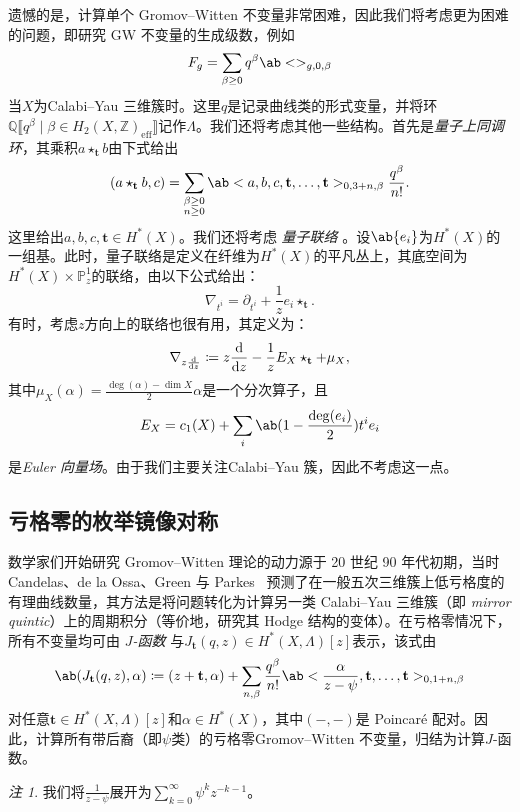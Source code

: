 \documentclass{amsart}
\theoremstyle{definition}
\theoremstyle{remark}
\newtheorem{rmk}[thm]{注}
\theoremstyle{plain}
\theoremstyle{definition}
\theoremstyle{remark}
\newcommand{\Z}{\mathbb{Z}}
\newcommand{\Q}{\mathbb{Q}}
\renewcommand{\P}{\mathbb{P}}
\newcommand{\mbf}[1]{\mathbf{#1}}
\newcommand{\mr}[1]{\mathrm{#1}}
\newcommand{\1}{\mathbf{1}}
\newcommand{\2}{\mathbf{2}}
\newcommand{\3}{\mathbf{3}}
\newcommand{\ps}[1]{\llbracket #1 \rrbracket}
\begin{document}
遗憾的是，计算单个 Gromov--Witten 不变量非常困难，因此我们将考虑更为困难的问题，即研究 GW 不变量的生成级数，例如
\[ F_g = \sum_{\beta \geq 0} q^{\beta} \ab<>_{g,0,\beta} \]
当\(X\)为Calabi--Yau 三维簇时。这里\(q\)是记录曲线类的形式变量，并将环\(\Q\ps{q^{\beta} \mid \beta \in H_2(X, \Z)_{\mr{eff}}}\)记作\(\Lambda\)。我们还将考虑其他一些结构。首先是\textit{量子上同调环}，其乘积\(a \star_{\mbf{t}} b\)由下式给出
\[
    (a \star_{\mbf{t}} b, c) = \sum_{\substack{\beta \geq 0 \\ n \geq 0}} \ab<a,b,c, \mbf{t}, \ldots, \mbf{t}>_{0,3+n,\beta} \frac{q^{\beta}}{n!}.
\]
这里给出\(a,b,c, \mbf{t} \in H^*(X)\)。我们还将考虑 \textit{ 量子联络 }。设\(\ab\{ e_i \}\)为\(H^*(X)\)的一组基。此时，量子联络是定义在纤维为\(H^*(X)\)的平凡丛上，其底空间为\(H^*(X) \times \P^1_z\)的联络，由以下公式给出：
\[ \nabla_{t^i} = \partial_{t^i} + \frac{1}{z} e_i \star_{\mbf{t}}. \]
有时，考虑\(z\)方向上的联络也很有用，其定义为：
\[ \nabla_{z \odv{}{z}} \coloneqq z \odv{}{z} - \frac{1}{z} E_X \star_{\mbf{t}} + \mu_X, \]
其中\(\mu_X(\alpha) = \frac{\deg(\alpha) - \dim X}{2} \alpha\)是一个分次算子，且
\[ E_X = c_1(X) + \sum_i \ab(1 - \frac{\deg(e_i)}{2})t^i e_i \]
是\textit{Euler 向量场}。由于我们主要关注Calabi--Yau 簇，因此不考虑这一点。

\subsection{亏格零的枚举镜像对称}%
\label{sub:Enumerative mirror symmetry in genus zero}

数学家们开始研究 Gromov--Witten 理论的动力源于 20 世纪 90 年代初期，当时 Candelas、de la Ossa、Green 与 Parkes~\cite{CandelasEtAl1991} 预测了在一般五次三维簇上低亏格度的有理曲线数量，其方法是将问题转化为计算另一类 Calabi--Yau 三维簇（即 \textit{mirror quintic}）上的周期积分（等价地，研究其 Hodge 结构的变体）。在亏格零情况下，所有不变量均可由 \textit{\(J\)-函数} 与\(J_{\mbf{t}}(q,z) \in H^*(X, \Lambda)[z]\)表示，该式由
\[ \ab( J_{\mbf{t}}(q, z), \alpha ) \coloneqq (z + \mbf{t}, \alpha) + \sum_{n, \beta} \frac{q^{\beta}}{n!} \ab< \frac{\alpha}{z-\psi}, \mbf{t}, \ldots, \mbf{t}>_{0,1+n, \beta} \]
对任意\(\mbf{t} \in H^*(X, \Lambda)[z]\)和\(\alpha \in H^*(X)\)，其中\((-,-)\)是 Poincar\'e 配对。因此，计算所有带后裔（即\(\psi\)类）的亏格零Gromov--Witten 不变量，归结为计算\(J\)-函数。

\begin{rmk}
我们将\(\frac{1}{z-\psi}\)展开为\(\sum_{k=0}^{\infty} \psi^k z^{-k-1}\)。
\end{rmk}
\end{document}
